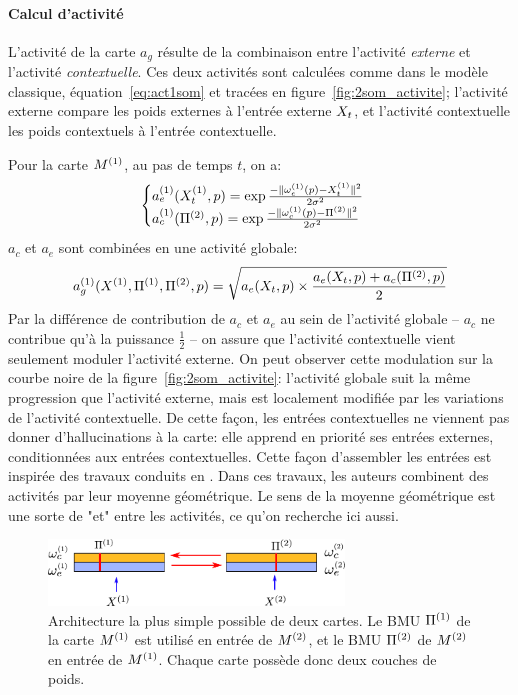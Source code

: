 \paragraph{Calcul d'activité}
L'activité de la carte $a_g$ résulte de la combinaison entre l'activité \emph{externe} et l'activité \emph{contextuelle}. Ces deux activités sont calculées comme dans le modèle classique, équation~\ref{eq:act1som} et tracées en figure~\ref{fig:2som_activite}; l'activité externe compare les poids externes à l'entrée externe $X_t$, et l'activité contextuelle les poids contextuels à l'entrée contextuelle.

Pour la carte $M^{({1})}$, au pas de temps $t$, on a:
\begin{equation}
\label{eq:activite}
\begin{cases}
a_e^{({1})}(X_t^{({1})},p) = \exp\frac{-\lVert \omega_e^{({1})}(p)-X^{({1})}_t \rVert^2}{2\sigma^2} \\
a_c^{({1})}(\Pi^{({2})},p) = \exp\frac{-\lVert \omega_c^{({1})}(p)-\Pi^{({2})} \rVert ^2}{2\sigma^2}\\
\end{cases}
\end{equation}
$a_c$ et $a_e$ sont combinées en une activité globale:
\begin{equation}
a_g^{({1})}(X^{({1})},\Pi^{({1})},\Pi^{({2})},p) = \sqrt{a_e(X_t,p)\times \frac{a_e(X_t,p) + a_c(\Pi^{({2})},p)}{2}}
\end{equation}
Par la différence de contribution de $a_c$ et $a_e$ au sein de l'activité globale -- $a_c$ ne contribue qu'à la puissance $\frac{1}{2}$ -- on assure que l'activité contextuelle vient seulement moduler l'activité externe.
On peut observer cette modulation sur la courbe noire de la figure~\ref{fig:2som_activite}: l'activité globale suit la même progression que l'activité externe, mais est localement modifiée par les variations de l'activité contextuelle. De cette façon, les entrées contextuelles ne viennent pas donner d'hallucinations à la carte: elle apprend en priorité ses entrées externes, conditionnées aux entrées contextuelles. Cette façon d'assembler les entrées est inspirée des travaux conduits en \cite{menard_model_2005}.
Dans ces travaux, les auteurs combinent des activités par leur moyenne géométrique. 
Le sens de la moyenne géométrique est une sorte de "et" entre les activités, ce qu'on recherche ici aussi.
\begin{figure}
\centering
\includegraphics[width=0.7\textwidth]{archi_2som}
\caption{Architecture la plus simple possible de deux cartes. Le BMU $\Pi^{({1})}$ de la carte $M^{({1})}$ est utilisé en entrée de $M^{({2})}$, et le BMU $\Pi^{({2})}$ de $M^{({2})}$ en entrée de $M^{({1})}$. Chaque carte possède donc deux couches de poids. \label{fig:2som_archi}}
\end{figure}
